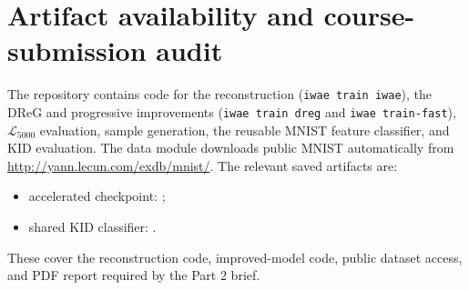 \documentclass[11pt]{article}
\begin{document}
\section*{Artifact availability and course-submission audit}
The repository contains code for the reconstruction (\texttt{iwae train iwae}),
the DReG and progressive improvements (\texttt{iwae train dreg} and
\texttt{iwae train-fast}), $\mathcal{L}_{5000}$ evaluation, sample generation,
the reusable MNIST feature classifier, and KID evaluation.  The data module
downloads public MNIST automatically from
\url{http://yann.lecun.com/exdb/mnist/}.  The relevant saved artifacts are:
\begin{itemize}
  \item accelerated checkpoint: ;
  \item shared KID classifier: .
\end{itemize}
These cover the reconstruction code, improved-model code, public dataset
access, and PDF report required by the Part 2 brief.

\clearpage


\end{document}
